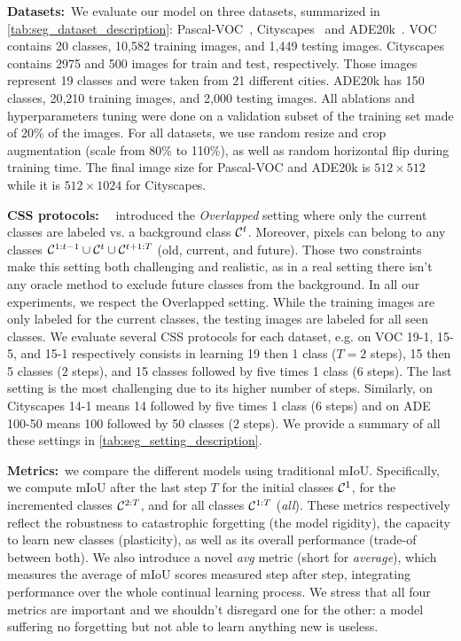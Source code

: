 \noindent\textbf{Datasets:\,} We evaluate our model on three datasets, summarized in
\autoref{tab:seg_dataset_description}: Pascal-VOC~\cite{everingham2015pascalvoc},
Cityscapes~\cite{cordts2016cityscapes} and ADE20k~\cite{zhou2017adedataset}. VOC contains 20
classes, 10,582 training images, and 1,449 testing images. Cityscapes contains 2975 and 500 images
for train and test, respectively. Those images represent 19 classes and were taken from 21 different
cities. ADE20k has 150 classes, 20,210 training images, and 2,000 testing images. All ablations and
hyperparameters tuning were done on a validation subset of the training set made of 20\% of the
images. For all datasets, we use random resize and crop augmentation (scale from 80\% to 110\%), as
well as random horizontal flip during training time. The final image size for Pascal-VOC and ADE20k
is $512 \times 512$ while it is $512 \times 1024$ for Cityscapes.

\noindent\textbf{\ac{CSS} protocols:\,} ~\cite{cermelli2020modelingthebackground} introduced the
\textit{Overlapped} setting where only the current classes are labeled vs. a background class
$\mathcal{C}^t$. Moreover, pixels can belong to any classes $\mathcal{C}^{1:t-1} \cup \mathcal{C}^{t} \cup \mathcal{C}^{t+1:T}$
(old, current, and future). Those two constraints make this setting both challenging and realistic,
as in a real setting there isn't any oracle method to exclude future classes from the background. In
all our experiments, we respect the Overlapped setting. While the training images are only labeled
for the current classes, the testing images are labeled for all seen classes. We evaluate several
\ac{CSS} protocols for each dataset, e.g. on VOC 19-1, 15-5, and 15-1 respectively consists in learning
19 then 1 class ($T=2$ steps), 15 then 5 classes ($2$ steps), and 15 classes followed by five times
1 class ($6$ steps). The last setting is the most challenging due to its higher number of steps.
Similarly, on Cityscapes 14-1 means 14 followed by five times 1 class ($6$ steps) and on ADE 100-50
means 100 followed by 50 classes ($2$ steps). We provide a summary of all these settings in
\autoref{tab:seg_setting_description}.

\noindent\textbf{Metrics:\,} we compare the different models using traditional \acf{mIoU}.
Specifically, we compute \ac{mIoU} after the last step $T$ for the initial classes $\mathcal{C}^{1}$, for
the incremented classes $\mathcal{C}^{2:T}$, and for all classes $\mathcal{C}^{1:T}$ (\textit{all}). These metrics
respectively reflect the robustness to catastrophic forgetting (the model rigidity), the capacity to
learn new classes (plasticity), as well as its overall performance (trade-of between both). We also
introduce a novel \textit{avg} metric (short for \textit{average}), which measures the average of
\ac{mIoU} scores measured step after step, integrating performance over the whole continual learning
process. We stress that all four metrics are important and we shouldn't disregard one for the other:
a model suffering no forgetting but not able to learn anything new is useless.

